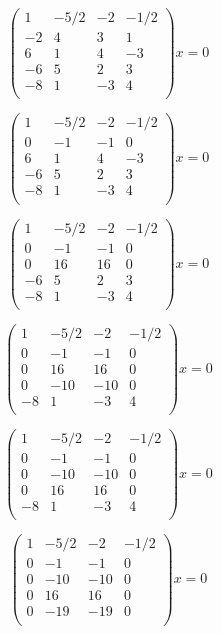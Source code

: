 \documentclass{article}
\begin{document}
\[
\left(
\begin{matrix}
1& -5/2& -2& -1/2\\
-2& 4& 3& 1\\
6& 1& 4& -3\\
-6& 5& 2& 3\\
-8& 1& -3& 4\\
\end{matrix}
\right) x = 0
\]

\[
\left(
\begin{matrix}
1& -5/2& -2& -1/2\\
0& -1& -1& 0\\
6& 1& 4& -3\\
-6& 5& 2& 3\\
-8& 1& -3& 4\\
\end{matrix}
\right) x = 0
\]

\[
\left(
\begin{matrix}
1& -5/2& -2& -1/2\\
0& -1& -1& 0\\
0& 16& 16& 0\\
-6& 5& 2& 3\\
-8& 1& -3& 4\\
\end{matrix}
\right) x = 0
\]

\[
\left(
\begin{matrix}
1& -5/2& -2& -1/2\\
0& -1& -1& 0\\
0& 16& 16& 0\\
0& -10& -10& 0\\
-8& 1& -3& 4\\
\end{matrix}
\right) x = 0
\]

\[
\left(
\begin{matrix}
1& -5/2& -2& -1/2\\
0& -1& -1& 0\\
0& -10& -10& 0\\
0& 16& 16& 0\\
-8& 1& -3& 4\\
\end{matrix}
\right) x = 0
\]

\[
\left(
\begin{matrix}
1& -5/2& -2& -1/2\\
0& -1& -1& 0\\
0& -10& -10& 0\\
0& 16& 16& 0\\
0& -19& -19& 0\\
\end{matrix}
\right) x = 0
\]
\end{document}

